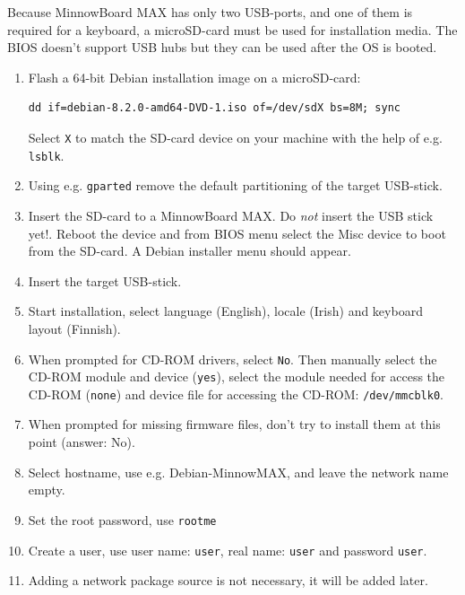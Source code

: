 \documentclass[a4paper,11pt]{article}
\newcommand{\cmd}[1]{\texttt{#1}}
\begin{document}
Because MinnowBoard MAX has only two USB-ports, and one of them is required for a keyboard, a microSD-card must be used for installation media. The BIOS doesn't support USB hubs but they can be used after the OS is booted.

\begin{enumerate}
\item Flash a 64-bit Debian installation image on a microSD-card:

\begin{lstlisting}
dd if=debian-8.2.0-amd64-DVD-1.iso of=/dev/sdX bs=8M; sync
\end{lstlisting}
Select \cmd{X} to match the SD-card device on your machine with the help of e.g. \cmd{lsblk}.

\item Using e.g. \cmd{gparted} remove the default partitioning of the target USB-stick.

\item Insert the SD-card to a MinnowBoard MAX. Do \emph{not} insert the USB stick yet!. Reboot the device and from BIOS menu select the Misc device to boot from the SD-card. A Debian installer menu should appear.

\item Insert the target USB-stick.

\item Start installation, select language (English), locale (Irish) and keyboard layout (Finnish).

\item When prompted for CD-ROM drivers, select \cmd{No}. Then manually select the CD-ROM module and device (\cmd{yes}), select the module needed for access the CD-ROM (\cmd{none}) and device file for accessing the CD-ROM: \cmd{/dev/mmcblk0}.

\item When prompted for missing firmware files, don't try to install them at this point (answer: No).

\item Select hostname, use e.g. Debian-MinnowMAX, and leave the network name empty.

\item Set the root password, use \cmd{rootme}

\item Create a user, use user name: \cmd{user}, real name: \cmd{user} and password \cmd{user}.

\item Adding a network package source is not necessary, it will be added later.


\end{enumerate}
\end{document}
